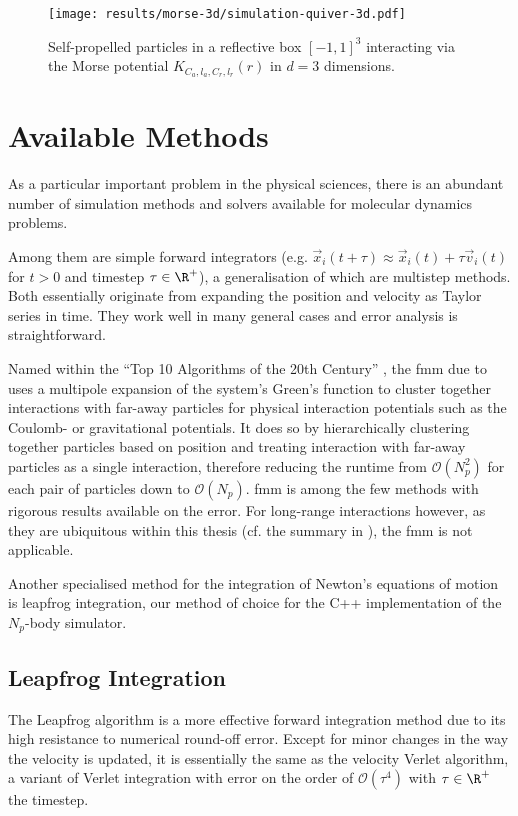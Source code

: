 \begin{figure}[H]
  \centering
  \texttt{[image: results/morse-3d/simulation-quiver-3d.pdf]}
  \caption[Self-propelled particles in 3D interacting through $K_{C_a, l_a, C_r, l_r}(r)$.]{Self-propelled particles in a reflective box $[-1, 1]^3$ interacting via the Morse potential $K_{C_a, l_a, C_r, l_r}(r)$ in $d=3$ dimensions.}
  \label{fig:morse-3d-quiver}
\end{figure}

\section{Available Methods}
As a particular important problem in the physical sciences, there is an abundant number of simulation methods and solvers available for molecular dynamics problems.

Among them are simple forward integrators (e.g. $\vec{x}_i(t + \tau) \approx \vec{x}_i(t) + \tau \vec{v}_i(t)$ for $t > 0$ and timestep $\tau \in \R^+$), a generalisation of which are multistep methods.
Both essentially originate from expanding the position and velocity as Taylor series in time.
They work well in many general cases and error analysis is straightforward.

Named within the ``Top 10 Algorithms of the 20th Century'' \parencite{2000-top-algorithms}, the \gls{fmm} due to \cite{1987-multipole-method} uses a multipole expansion of the system's Green's function to cluster together interactions with far-away particles for physical interaction potentials such as the Coulomb- or gravitational potentials.
It does so by hierarchically clustering together particles based on position and treating interaction with far-away particles as a single interaction, therefore reducing the runtime from $\mathcal{O}(N_p^2)$ for each pair of particles down to $\mathcal{O}(N_p)$.
\gls{fmm} is among the few methods with rigorous results available on the error.
For long-range interactions however, as they are ubiquitous within this thesis (cf. the summary in ), the \gls{fmm} is not applicable.

Another specialised method for the integration of Newton's equations of motion is leapfrog integration, our method of choice for the C++ implementation of the $N_p$-body simulator.

\subsection{Leapfrog Integration}
The Leapfrog algorithm is a more effective forward integration method due to its high resistance to numerical round-off error.
Except for minor changes in the way the velocity is updated, it is essentially the same as the velocity Verlet algorithm, a variant of Verlet integration with error on the order of $\mathcal{O}(\tau^4)$ with $\tau \in \R^+$ the timestep.

